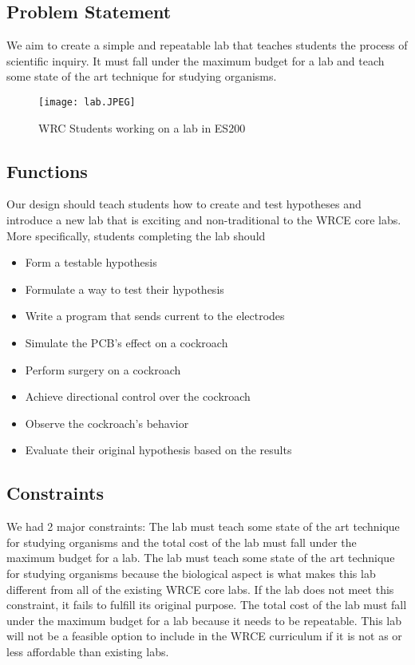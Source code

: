 \documentclass{article}
\begin{document}
\subsection{Problem Statement}
\par We aim to create a simple and repeatable lab that teaches students the process of scientific inquiry. It must fall under the maximum budget for a lab and teach some state of the art technique for studying organisms.

\begin{figure}[ht!]
\centering
\texttt{[image: lab.JPEG]}
\caption{WRC Students working on a lab in ES200}
\label{fig:hollywood}
\end{figure}

\subsection{Functions}
\par Our design should teach students how to create and test hypotheses and introduce a new lab that is exciting and non-traditional to the WRCE core labs. More specifically, students completing the lab should

\begin{itemize}
  \item Form a testable hypothesis
  \item Formulate a way to test their hypothesis
  \item Write a program that sends current to the electrodes
  \item Simulate the PCB's effect on a cockroach
  \item Perform surgery on a cockroach
  \item Achieve directional control over the cockroach
  \item Observe the cockroach's behavior
  \item Evaluate their original hypothesis based on the results
\end{itemize}

\subsection{Constraints}
\par We had 2 major constraints: The lab must teach some state of the art technique for studying organisms and the total cost of the lab must fall under the maximum budget for a lab. The lab must teach some state of the art technique for studying organisms because the biological aspect is what makes this lab different from all of the existing WRCE core labs. If the lab does not meet this constraint, it fails to fulfill its original purpose. The total cost of the lab must fall under the maximum budget for a lab because it needs to be repeatable. This lab will not be a feasible option to include in the WRCE curriculum if it is not as or less affordable than existing labs.
\end{document}

